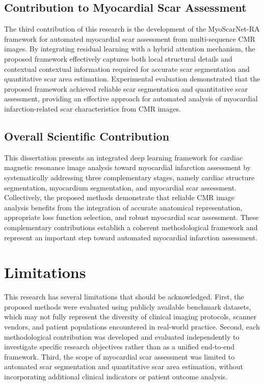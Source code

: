 \subsection{Contribution to Myocardial Scar Assessment}

The third contribution of this research is the development of the MyoScarNet-RA framework for automated myocardial scar assessment from multi-sequence CMR images. By integrating residual learning with a hybrid attention mechanism, the proposed framework effectively captures both local structural details and contextual contextual information required for accurate scar segmentation and quantitative scar area estimation. Experimental evaluation demonstrated that the proposed framework achieved reliable scar segmentation and quantitative scar assessment, providing an effective approach for automated analysis of myocardial infarction-related scar characteristics from CMR images.

\subsection{Overall Scientific Contribution}
\label{subsec:ch7-scientific-contributions}

This dissertation presents an integrated deep learning framework for cardiac magnetic resonance image analysis toward myocardial infarction assessment by systematically addressing three complementary stages, namely cardiac structure segmentation, myocardium segmentation, and myocardial scar assessment. Collectively, the proposed methods demonstrate that reliable CMR image analysis benefits from the integration of accurate anatomical representation, appropriate loss function selection, and robust myocardial scar assessment. These complementary contributions establish a coherent methodological framework and represent an important step toward automated myocardial infarction assessment.

\section{Limitations}
\label{sec:ch7-limitations}

This research has several limitations that should be acknowledged. First, the proposed methods were evaluated using publicly available benchmark datasets, which may not fully represent the diversity of clinical imaging protocols, scanner vendors, and patient populations encountered in real-world practice. Second, each methodological contribution was developed and evaluated independently to investigate specific research objectives rather than as a unified end-to-end framework. Third, the scope of myocardial scar assessment was limited to automated scar segmentation and quantitative scar area estimation, without incorporating additional clinical indicators or patient outcome analysis.

